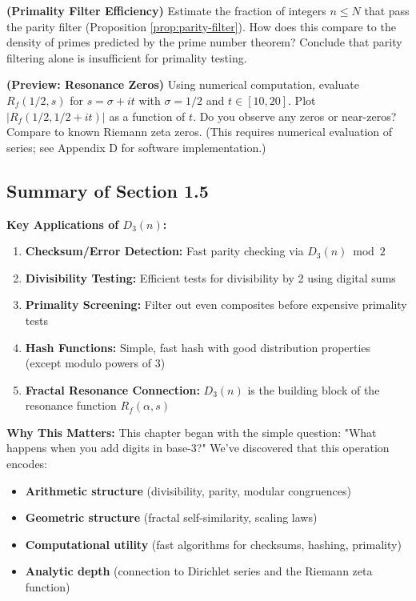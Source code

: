 \begin{exercise}
\textbf{(Primality Filter Efficiency)} Estimate the fraction of integers $n \leq N$ that pass the parity filter (Proposition \ref{prop:parity-filter}). How does this compare to the density of primes predicted by the prime number theorem? Conclude that parity filtering alone is insufficient for primality testing.
\end{exercise}

\begin{exercise}
\textbf{(Preview: Resonance Zeros)} Using numerical computation, evaluate $R_f(1/2, s)$ for $s = \sigma + it$ with $\sigma = 1/2$ and $t \in [10, 20]$. Plot $|R_f(1/2, 1/2 + it)|$ as a function of $t$. Do you observe any zeros or near-zeros? Compare to known Riemann zeta zeros. (This requires numerical evaluation of series; see Appendix D for software implementation.)
\end{exercise}

\subsection{Summary of Section 1.5}

\textbf{Key Applications of $D_3(n)$:}
\begin{enumerate}
\item \textbf{Checksum/Error Detection:} Fast parity checking via $D_3(n) \bmod 2$
\item \textbf{Divisibility Testing:} Efficient tests for divisibility by 2 using digital sums
\item \textbf{Primality Screening:} Filter out even composites before expensive primality tests
\item \textbf{Hash Functions:} Simple, fast hash with good distribution properties (except modulo powers of 3)
\item \textbf{Fractal Resonance Connection:} $D_3(n)$ is the building block of the resonance function $R_f(\alpha, s)$
\end{enumerate}

\textbf{Why This Matters:} This chapter began with the simple question: "What happens when you add digits in base-3?" We've discovered that this operation encodes:
\begin{itemize}
\item \textbf{Arithmetic structure} (divisibility, parity, modular congruences)
\item \textbf{Geometric structure} (fractal self-similarity, scaling laws)
\item \textbf{Computational utility} (fast algorithms for checksums, hashing, primality)
\item \textbf{Analytic depth} (connection to Dirichlet series and the Riemann zeta function)
\end{itemize}

